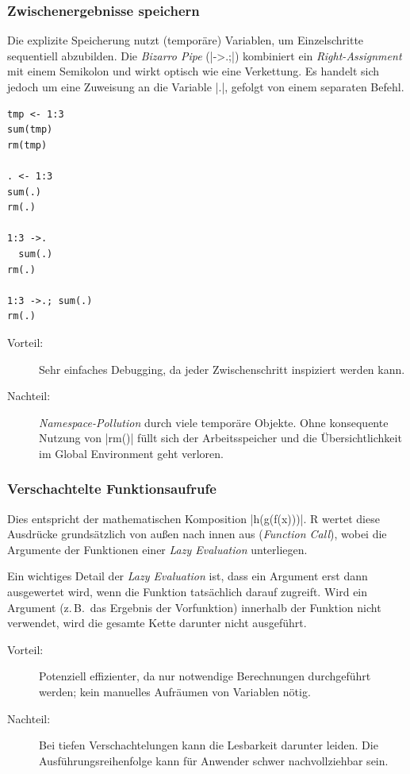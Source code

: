 \documentclass[10pt,twocolumn]{scrartcl}
\renewcommand{\lstinline}{\mycoloredinline}
\begin{document}
\subsubsection{Zwischenergebnisse speichern}

Die explizite Speicherung nutzt (temporäre) Variablen, um Einzelschritte sequentiell abzubilden. Die \emph{Bizarro Pipe} (\lstinline|->.;|) kombiniert ein \emph{Right-Assignment} mit einem Semikolon und wirkt optisch wie eine Verkettung. Es handelt sich jedoch um eine Zuweisung an die Variable \lstinline|.|, gefolgt von einem separaten Befehl.

\begin{lstlisting}
tmp <- 1:3
sum(tmp)
rm(tmp)

. <- 1:3
sum(.)
rm(.)

1:3 ->.
  sum(.)
rm(.)

1:3 ->.; sum(.)
rm(.)
\end{lstlisting}

\begin{description}
\item[Vorteil:] Sehr einfaches Debugging, da jeder Zwischenschritt inspiziert werden kann.
\item[Nachteil:] \emph{Namespace-Pollution} durch viele temporäre Objekte. Ohne konsequente Nutzung von \lstinline|rm()| füllt sich der Arbeitsspeicher und die Übersichtlichkeit im Global Environment geht verloren.
\end{description}


\subsubsection{Verschachtelte Funktionsaufrufe}

Dies entspricht der mathematischen Komposition \lstinline|h(g(f(x)))|. R wertet diese Ausdrücke grundsätzlich von außen nach innen aus (\emph{Function Call}), wobei die Argumente der Funktionen einer \emph{Lazy Evaluation} unterliegen.

Ein wichtiges Detail der \emph{Lazy Evaluation} ist, dass ein Argument erst dann ausgewertet wird, wenn die Funktion tatsächlich darauf zugreift. Wird ein Argument (z.\,B.\ das Ergebnis der Vorfunktion) innerhalb der Funktion nicht verwendet, wird die gesamte Kette darunter nicht ausgeführt.

\begin{description}
\item[Vorteil:] Potenziell effizienter, da nur notwendige Berechnungen durchgeführt werden; kein manuelles Aufräumen von Variablen nötig.
\item[Nachteil:] Bei tiefen Verschachtelungen kann die Lesbarkeit darunter leiden. Die Ausführungsreihenfolge kann für Anwender schwer nachvollziehbar sein.
\end{description}
\end{document}
